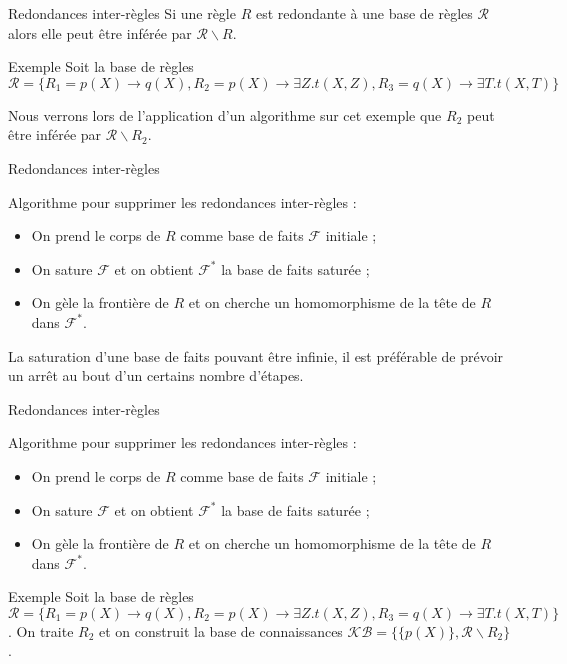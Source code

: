  \begin{frame}{Redondances inter-règles}
    Si une règle $R$ est redondante à une base de règles $\mathcal{R}$ alors elle peut être inférée par $\mathcal{R} \backslash R$.
    
    \begin{block}{Exemple}
        Soit la base de règles $\mathcal{R} = \{ R_1 = p(X) \xrightarrow{} q(X), R_2 = p(X) \xrightarrow{} \exists Z.t(X,Z), R_3 = q(X) \xrightarrow{} \exists T.t(X,T)\}$
    \end{block}
    
    Nous verrons lors de l'application d'un algorithme sur cet exemple que $R_2$ peut être inférée par $\mathcal{R} \backslash R_2$.
    
\end{frame}

\begin{frame}{Redondances inter-règles}
   
   Algorithme pour supprimer les redondances inter-règles :
    
    \begin{itemize}
        \item On prend le corps de $R$ comme base de faits $\mathcal{F}$ initiale ;
        \item On sature $\mathcal{F}$ et on obtient $\mathcal{F}^*$ la base de faits saturée ;
        \item On gèle la frontière de $R$ et on cherche un homomorphisme de la tête de $R$ dans $\mathcal{F}^*$.
    \end{itemize}
    
    La saturation d'une base de faits pouvant être infinie, il est préférable de prévoir un arrêt au bout d'un certains nombre d'étapes.
    
\end{frame}

\begin{frame}{Redondances inter-règles}
   
   Algorithme pour supprimer les redondances inter-règles :
    
    \begin{itemize}
       \color{red}
        \item On prend le corps de $R$ comme base de faits $\mathcal{F}$ initiale ;
       \color{black}
        \item On sature $\mathcal{F}$ et on obtient $\mathcal{F}^*$ la base de faits saturée ;
        \item On gèle la frontière de $R$ et on cherche un homomorphisme de la tête de $R$ dans $\mathcal{F}^*$.
        
    \end{itemize}
    
    \begin{block}{Exemple}
          Soit la base de règles $\mathcal{R} = \{ R_1 = p(X) \xrightarrow{} q(X), R_2 = p(X) \xrightarrow{} \exists Z.t(X,Z), R_3 = q(X) \xrightarrow{} \exists T.t(X,T)\}$. On traite $R_2$ et on construit la base de connaissances $\mathcal{KB} = \{ \{p(X)\}, \mathcal{R} \backslash R_2\}$.
    \end{block}
    
\end{frame}

